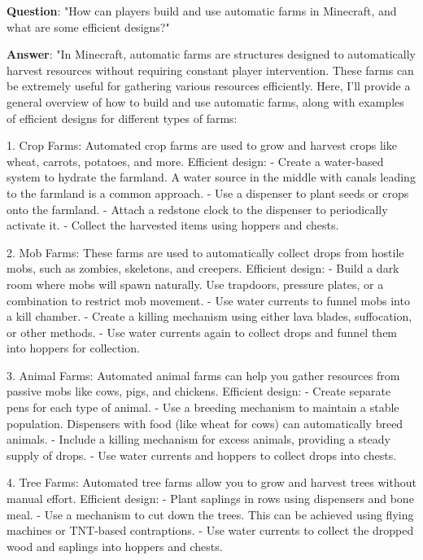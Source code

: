 \begin{prompt}[title={Example of World Knowledge Dataset}, label=World Knowledge Post Training Datasets]
\begin{center}
\begin{minipage}{\dimexpr0.95\linewidth}
\vspace{4pt}

\textbf{Question}: "How can players build and use automatic farms in Minecraft, and what are some efficient designs?"

\textbf{Answer}: "In Minecraft, automatic farms are structures designed to automatically harvest resources without requiring constant player intervention. These farms can be extremely useful for gathering various resources efficiently. Here, I'll provide a general overview of how to build and use automatic farms, along with examples of efficient designs for different types of farms:

1. Crop Farms:
Automated crop farms are used to grow and harvest crops like wheat, carrots, potatoes, and more.
Efficient design:
- Create a water-based system to hydrate the farmland. A water source in the middle with canals leading to the farmland is a common approach.
- Use a dispenser to plant seeds or crops onto the farmland.
- Attach a redstone clock to the dispenser to periodically activate it.
- Collect the harvested items using hoppers and chests.

2. Mob Farms:
These farms are used to automatically collect drops from hostile mobs, such as zombies, skeletons, and creepers.
Efficient design:
- Build a dark room where mobs will spawn naturally. Use trapdoors, pressure plates, or a combination to restrict mob movement.
- Use water currents to funnel mobs into a kill chamber.
- Create a killing mechanism using either lava blades, suffocation, or other methods.
- Use water currents again to collect drops and funnel them into hoppers for collection.

3. Animal Farms:
Automated animal farms can help you gather resources from passive mobs like cows, pigs, and chickens.
Efficient design:
- Create separate pens for each type of animal.
- Use a breeding mechanism to maintain a stable population. Dispensers with food (like wheat for cows) can automatically breed animals.
- Include a killing mechanism for excess animals, providing a steady supply of drops.
- Use water currents and hoppers to collect drops into chests.

4. Tree Farms:
Automated tree farms allow you to grow and harvest trees without manual effort.
Efficient design:
- Plant saplings in rows using dispensers and bone meal.
- Use a mechanism to cut down the trees. This can be achieved using flying machines or TNT-based contraptions.
- Use water currents to collect the dropped wood and saplings into hoppers and chests.


\end{minipage}
\end{center}
\end{prompt}
